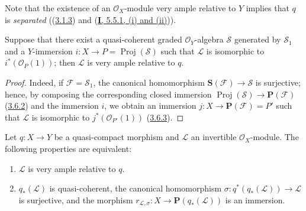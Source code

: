 Note that the existence of an $\mathcal{O}_X$-module very ample relative
to $Y$ implies that $q$ is \emph{separated}
((\hyperref[II.3.1.3]{3.1.3}) and
(\hyperref[I.5.5.1]{\textbf{I}, 5.5.1, (i) and (ii)})).

\begin{corollary}[4.4.3]
\label{II.4.4.3}
Suppose that there exist a quasi-coherent graded $\mathcal{O}_Y$-algebra
$\mathcal{S}$ generated by $\mathcal{S}_1$ and a $Y$-immersion
$i:X\to P=\operatorname{Proj}(\mathcal{S})$ such that $\mathcal{L}$ is
isomorphic to $i^*(\mathcal{O}_P(1))$; then $\mathcal{L}$ is very ample
relative to $q$.
\end{corollary}

\begin{proof}
Indeed, if $\mathcal{F}=\mathcal{S}_1$, the canonical homomorphism
$\mathbf{S}(\mathcal{F})\to\mathcal{S}$ is surjective; hence, by composing
the corresponding closed immersion
$\operatorname{Proj}(\mathcal{S})\to\mathbf{P}(\mathcal{F})$
(\hyperref[II.3.6.2]{3.6.2}) and the immersion $i$, we obtain an immersion
$j:X\to\mathbf{P}(\mathcal{F})=P'$ such that $\mathcal{L}$ is isomorphic to
$j^*(\mathcal{O}_{P'}(1))$ (\hyperref[II.3.6.3]{3.6.3}).
\end{proof}

\begin{proposition}[4.4.4]
\label{II.4.4.4}
Let $q:X\to Y$ be a quasi-compact morphism and $\mathcal{L}$ an invertible
$\mathcal{O}_X$-module. The following properties are
equivalent:
\begin{enumerate}
  \item[\rm{a)}] $\mathcal{L}$ is very ample relative to $q$.
  \item[\rm{b)}] $q_*(\mathcal{L})$ is quasi-coherent, the canonical
  homomorphism $\sigma:q^*(q_*(\mathcal{L}))\to\mathcal{L}$ is surjective, and
  the morphism
  $r_{\mathcal{L},\sigma}:X\to\mathbf{P}(q_*(\mathcal{L}))$ is an immersion.
\end{enumerate}
\end{proposition}

